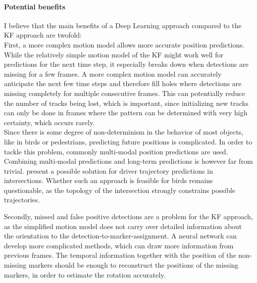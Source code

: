 \documentclass{article}
\begin{document}
\paragraph{Potential benefits}
I believe that the main benefits of a Deep Learning approach  compared to the KF approach are twofold: \\
First, a more complex motion model allows more accurate position predictions. While the relatively simple motion model of the KF might work well for predictions for the next time step, it especially breaks down when detections are missing for a few frames. A more complex motion model can accurately anticipate the next few time steps and therefore fill holes where detections are missing completely for multiple consecutive frames. This can potentially reduce the number of tracks being lost, which is important, since initializing new tracks can only be done in frames where the pattern can be determined with very high certainty, which occurs rarely.\\
Since there is some degree of non-determinism in the behavior of most objects, like in birds or pedestrians, predicting future positions is complicated. In order to tackle this problem, commonly multi-modal position predictions are used. Combining multi-modal predictions and long-term predictions is however far from trivial. \cite{multi_modal} present a possible solution for driver trajectory predictions in intersections. Whether such an approach is feasible for birds remains questionable, as the topology of the intersection strongly constrains possible trajectories.

Secondly, missed and false positive detections are a problem for the KF approach, as the simplified motion model does not carry over detailed information about the orientation to the detection-to-marker-assignment. A neural network can develop more complicated methods, which can draw more information from previous frames. The temporal information together with the position of the non-missing markers should be enough to reconstruct the positions of the missing markers, in order to estimate the rotation accurately.
\end{document}
